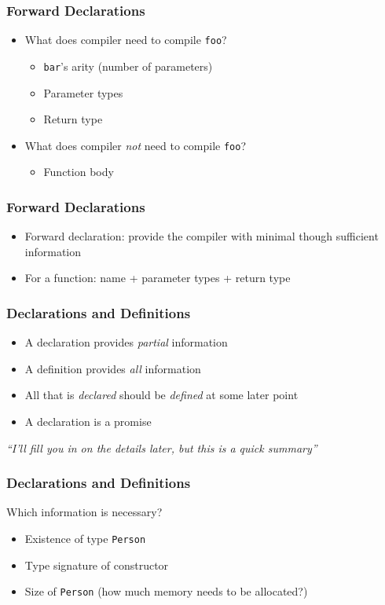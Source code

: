 \documentclass{../ucll-slides}
\begin{document}
\begin{frame}
  \frametitle{Forward Declarations}
  \begin{itemize}
    \item What does compiler need to compile {\tt foo}?
          \begin{itemize}
            \item {\tt bar}'s arity (number of parameters)
            \item Parameter types
            \item Return type
          \end{itemize}
    \item What does compiler \emph{not} need to compile {\tt foo}?
          \begin{itemize}
            \item Function body
          \end{itemize}
  \end{itemize}
\end{frame}

\begin{frame}
  \frametitle{Forward Declarations}
  \begin{itemize}
    \item Forward declaration: provide the compiler with minimal though sufficient information
    \item For a function: name + parameter types + return type
  \end{itemize}
\end{frame}

\begin{frame}
  \frametitle{Declarations and Definitions}
  \begin{itemize}
    \item A declaration provides \emph{partial} information
    \item A definition provides \emph{all} information
    \item All that is \emph{declared} should be \emph{defined} at some later point
    \item A declaration is a promise
  \end{itemize}
  \begin{center} \it
    ``I'll fill you in on the details later, but this is a quick summary''
  \end{center}
\end{frame}

\begin{frame}
  \frametitle{Declarations and Definitions}
  Which information is necessary?
  \begin{itemize}
    \item Existence of type {\tt Person}
    \item Type signature of constructor
    \item Size of {\tt Person} (how much memory needs to be allocated?)
  \end{itemize}
\end{frame}
\end{document}
